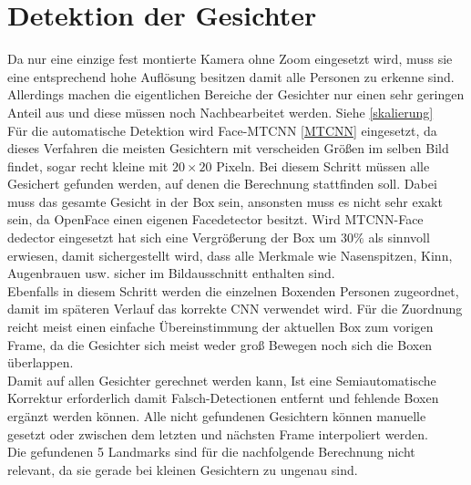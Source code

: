 \section{Detektion der Gesichter}
\label{detection_Gesicht}
Da nur eine einzige fest montierte Kamera ohne Zoom eingesetzt wird, muss sie eine entsprechend hohe Auflösung besitzen damit alle Personen zu erkenne sind. Allerdings machen die eigentlichen Bereiche der Gesichter nur einen sehr geringen Anteil aus und diese müssen noch Nachbearbeitet werden. Siehe \ref{skalierung}\\
Für die automatische Detektion wird Face-MTCNN  \ref{MTCNN} eingesetzt, da dieses Verfahren die meisten Gesichtern mit verscheiden Größen im selben Bild findet, sogar recht kleine mit $20\times 20$ Pixeln. Bei diesem Schritt müssen alle Gesichert gefunden werden, auf denen die Berechnung stattfinden soll. Dabei muss das gesamte Gesicht in der Box sein, ansonsten muss es nicht sehr exakt sein, da OpenFace einen eigenen Facedetector besitzt. Wird MTCNN-Face dedector eingesetzt hat sich eine Vergrößerung der Box um $30\%$ als sinnvoll erwiesen, damit sichergestellt wird, dass alle Merkmale wie Nasenspitzen, Kinn, Augenbrauen usw. sicher im Bildausschnitt enthalten sind.\\
Ebenfalls in diesem Schritt werden die einzelnen Boxenden Personen zugeordnet, damit im späteren Verlauf das korrekte CNN verwendet wird. Für die Zuordnung reicht meist einen einfache Übereinstimmung der aktuellen Box zum vorigen Frame, da die Gesichter sich meist weder groß Bewegen noch sich die Boxen überlappen.\\
Damit auf allen Gesichter gerechnet werden kann, Ist eine Semiautomatische Korrektur erforderlich damit Falsch-Detectionen entfernt und fehlende Boxen ergänzt werden können. Alle nicht gefundenen Gesichtern können manuelle gesetzt oder zwischen dem letzten und nächsten Frame interpoliert werden.\\
Die gefundenen 5 Landmarks sind für die nachfolgende Berechnung nicht relevant, da sie gerade bei kleinen Gesichtern zu ungenau sind.